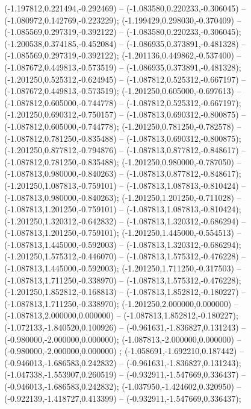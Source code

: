  (-1.197812,0.221494,-0.292469) -- (-1.083580,0.220233,-0.306045) -- (-1.080972,0.142769,-0.223229);
 (-1.199429,0.298030,-0.370409) -- (-1.085569,0.297319,-0.392122) -- (-1.083580,0.220233,-0.306045);
 (-1.200538,0.374185,-0.452084) -- (-1.086935,0.373891,-0.481328) -- (-1.085569,0.297319,-0.392122);
 (-1.201136,0.449862,-0.537400) -- (-1.087672,0.449813,-0.573519) -- (-1.086935,0.373891,-0.481328);
 (-1.201250,0.525312,-0.624945) -- (-1.087812,0.525312,-0.667197) -- (-1.087672,0.449813,-0.573519);
 (-1.201250,0.605000,-0.697613) -- (-1.087812,0.605000,-0.744778) -- (-1.087812,0.525312,-0.667197);
 (-1.201250,0.690312,-0.750157) -- (-1.087813,0.690312,-0.800875) -- (-1.087812,0.605000,-0.744778);
 (-1.201250,0.781250,-0.782578) -- (-1.087812,0.781250,-0.835488) -- (-1.087813,0.690312,-0.800875);
 (-1.201250,0.877812,-0.794876) -- (-1.087813,0.877812,-0.848617) -- (-1.087812,0.781250,-0.835488);
 (-1.201250,0.980000,-0.787050) -- (-1.087813,0.980000,-0.840263) -- (-1.087813,0.877812,-0.848617);
 (-1.201250,1.087813,-0.759101) -- (-1.087813,1.087813,-0.810424) -- (-1.087813,0.980000,-0.840263);
 (-1.201250,1.201250,-0.711028) -- (-1.087813,1.201250,-0.759101) -- (-1.087813,1.087813,-0.810424);
 (-1.201250,1.320312,-0.642832) -- (-1.087813,1.320312,-0.686294) -- (-1.087813,1.201250,-0.759101);
 (-1.201250,1.445000,-0.554513) -- (-1.087813,1.445000,-0.592003) -- (-1.087813,1.320312,-0.686294);
 (-1.201250,1.575312,-0.446070) -- (-1.087813,1.575312,-0.476228) -- (-1.087813,1.445000,-0.592003);
 (-1.201250,1.711250,-0.317503) -- (-1.087813,1.711250,-0.338970) -- (-1.087813,1.575312,-0.476228);
 (-1.201250,1.852812,-0.168813) -- (-1.087813,1.852812,-0.180227) -- (-1.087813,1.711250,-0.338970);
 (-1.201250,2.000000,0.000000) -- (-1.087813,2.000000,0.000000) -- (-1.087813,1.852812,-0.180227);
 (-1.072133,-1.840520,0.100926) -- (-0.961631,-1.836827,0.131243) -- (-0.980000,-2.000000,0.000000);
 (-1.087813,-2.000000,0.000000) -- (-0.980000,-2.000000,0.000000) ;
 (-1.058691,-1.692210,0.187442) -- (-0.946013,-1.686583,0.242832) -- (-0.961631,-1.836827,0.131243);
 (-1.047338,-1.553907,0.260519) -- (-0.932911,-1.547669,0.336437) -- (-0.946013,-1.686583,0.242832);
 (-1.037950,-1.424602,0.320950) -- (-0.922139,-1.418727,0.413399) -- (-0.932911,-1.547669,0.336437);
